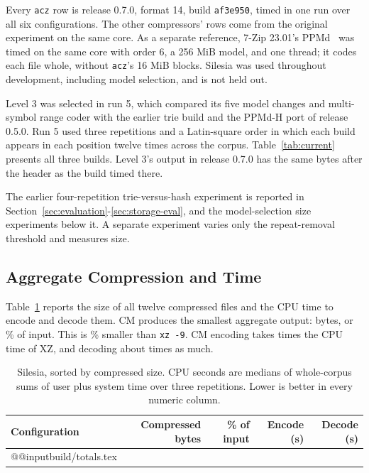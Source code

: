 \documentclass[10pt,letterpaper]{article}
\newcommand{\acz}{\texttt{acz}}
\newcommand{\code}[1]{\texttt{#1}}
\begin{document}
Every \acz{} row is release 0.7.0, format 14, build \code{af3e950}, timed in one run over all six configurations. The other compressors' rows come from the original experiment on the same core. As a separate reference, 7-Zip 23.01's PPMd~\cite{ppmd} was timed on the same core with order 6, a 256 MiB model, and one thread; it codes each file whole, without \acz{}'s 16 MiB blocks. Silesia was used throughout development, including model selection, and is not held out.

Level 3 was selected in run 5, which compared its five model changes and multi-symbol range coder with the earlier trie build and the PPMd-H port of release 0.5.0. Run 5 used three repetitions and a Latin-square order in which each build appears in each position twelve times across the corpus. Table~\ref{tab:current} presents all three builds. Level 3's output in release 0.7.0 has the same bytes after the header as the build timed there.



The earlier four-repetition trie-versus-hash experiment is reported in Section~\ref{sec:evaluation}-\ref{sec:storage-eval}, and the model-selection size experiments below it. A separate experiment varies only the repeat-removal threshold and measures size.

\subsection{Aggregate Compression and Time}
Table~\ref{tab:totals} reports the size of all twelve compressed files and the CPU time to encode and decode them. CM produces the smallest aggregate output: \CmBytes{} bytes, or \CmFraction\% of input. This is \CmSmallerXz\% smaller than \code{xz -9}. CM encoding takes \CmXzEncodeRatio{} times the CPU time of XZ, and decoding about \CmXzDecodeRatio{} times as much.

\begin{table}[htbp]
\centering
\caption{Silesia, sorted by compressed size. CPU seconds are medians of whole-corpus sums of user plus system time over three repetitions. Lower is better in every numeric column.}\label{tab:totals}
\medskip
\begin{tabular}{@{}lrrrr@{}}
\toprule
Configuration & Compressed bytes & \% of input & Encode (s) & Decode (s)\\
\midrule
\csname @@input\endcsname build/totals.tex
\bottomrule
\end{tabular}
\end{table}
\end{document}
